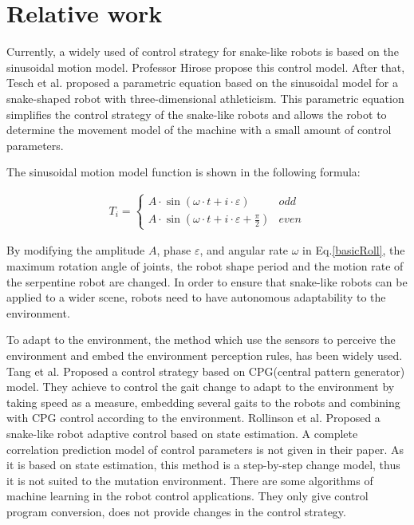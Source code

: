 \section{Relative work}
Currently, a widely used of control strategy for snake-like robots is based on the sinusoidal motion model\cite{HiroseSine}. Professor Hirose propose this control model. After that, Tesch et al. proposed a parametric equation based on the sinusoidal model for a snake-shaped robot with three-dimensional athleticism\cite{ChosetSine}. This parametric equation simplifies the control strategy of the snake-like robots and allows the robot to determine the movement model of the machine with a small amount of control parameters.

The sinusoidal motion model function is shown in the following formula:

\begin{eqnarray}\label{basicRoll}
T_i=\left\{
\begin{array}{lr}
A\cdot \sin (\omega \cdot t + i\cdot \varepsilon )&odd\\
A\cdot \sin (\omega \cdot t + i\cdot \varepsilon +  \frac{\pi}{2})&even
\end{array}
\right.
\end{eqnarray}

By modifying the amplitude $A$, phase $\varepsilon$, and angular rate $\omega$ in Eq.\ref{basicRoll}, the maximum rotation angle of joints, the robot shape period and the motion rate of the serpentine robot are changed. In order to ensure that snake-like robots can be applied to a wider scene, robots need to have autonomous adaptability to the environment.

To adapt to the environment, the method which use the sensors to perceive the environment and embed the environment perception rules, has been widely used\cite{CPGenabling}\cite{GaitBasedCompliant}\cite{BalancingAndControl}\cite{FeedbackControlOfSoft}. Tang et al. Proposed a control strategy based on CPG(central pattern generator) model\cite{CPGenabling}. They achieve to control the gait change to adapt to the environment by taking speed as a measure,  embedding several gaits to the robots and combining with CPG control according to the environment. Rollinson et al. Proposed a snake-like robot adaptive control based on state estimation\cite{GaitBasedCompliant}. A complete correlation prediction model of control parameters is not given in their paper. As it is based on state estimation, this method is a step-by-step change model, thus it is not suited to the mutation environment. There are some algorithms of machine learning in the robot control applications\cite{InformationDriven}\cite{NovelPlasticityRule}\cite{MissileSystems}\cite{NeuroFuzzyBayesian}. They only give control program conversion, does not provide changes in the control strategy.


